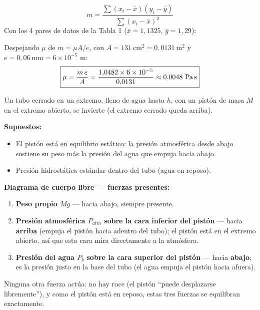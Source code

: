\documentclass[11pt]{article}
\newenvironment{supuestos}{%
  \noindent\textbf{Supuestos:}
  \begin{itemize}[leftmargin=1.4em, itemsep=1pt]
}{%
  \end{itemize}
}
\newenvironment{dcl}{%
  \noindent\textbf{Diagrama de cuerpo libre --- fuerzas presentes:}
  \begin{enumerate}[leftmargin=1.6em, itemsep=2pt, label=\arabic*.]
}{%
  \end{enumerate}
}
\begin{document}
\begin{equation}
m=\frac{\sum(x_i-\bar x)(y_i-\bar y)}{\sum(x_i-\bar x)^2}
\end{equation}
Con los 4 pares de datos de la Tabla 1 ($\bar x=1{,}1325$, $\bar y=1{,}29$):
\begin{center}
\end{center}
Despejando $\mu$ de $m=\mu A/e$, con $A=131\ \text{cm}^2=0{,}0131\ \text{m}^2$ y
$e=0{,}06\ \text{mm}=6\times10^{-5}$ m:
\begin{equation}
\boxed{\mu=\frac{m\,e}{A}=\frac{1{,}0482\times6\times10^{-5}}{0{,}0131}\approx0{,}0048\ \text{Pa\,s}}
\end{equation}

\newpage
{}

\noindent Un tubo cerrado en un extremo, lleno de agua hasta $h$, con un pist\'on de masa
$M$ en el extremo abierto, se invierte (el extremo cerrado queda arriba).

\begin{supuestos}
\item El pist\'on est\'a en equilibrio est\'atico: la presi\'on atmosf\'erica desde abajo
sostiene su peso m\'as la presi\'on del agua que empuja hacia abajo.
\item Presi\'on hidrost\'atica est\'andar dentro del tubo (agua en reposo).
\end{supuestos}

\begin{dcl}
\item \textbf{Peso propio $Mg$} --- hacia abajo, siempre presente.
\item \textbf{Presi\'on atmosf\'erica $P_{atm}$ sobre la cara inferior del pist\'on}
--- hacia \textbf{arriba} (empuja el pist\'on hacia adentro del tubo); el pist\'on est\'a
en el extremo abierto, as\'i que esta cara mira directamente a la atm\'osfera.
\item \textbf{Presi\'on del agua $P_b$ sobre la cara superior del pist\'on} --- hacia
\textbf{abajo}; es la presi\'on justo en la base del tubo (el agua empuja el pist\'on
hacia afuera).
\end{dcl}
Ninguna otra fuerza act\'ua: no hay roce (el pist\'on ``puede desplazarse libremente''),
y como el pist\'on est\'a en reposo, estas tres fuerzas se equilibran exactamente.
\end{document}
